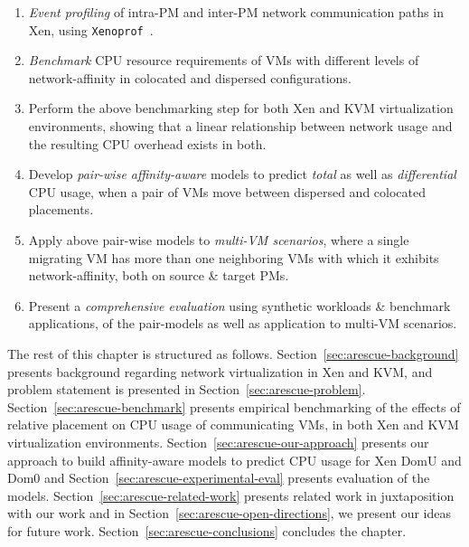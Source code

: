 \begin{enumerate}	
\item \emph{Event profiling} of intra-PM and inter-PM network
	communication paths in Xen, using \texttt{Xenoprof}~\cite{xenoprof}.
\item \emph{Benchmark} CPU resource requirements
of VMs with different levels of network-affinity
in colocated and dispersed configurations.
\item Perform the above benchmarking step for both Xen and KVM virtualization environments,
	showing that a linear relationship between network usage and the resulting CPU overhead
	exists in both.
\item Develop \emph{pair-wise affinity-aware} models to predict \textit{total}
	as well as \textit{differential} CPU usage, when a pair of VMs move between
	dispersed and colocated placements.
\item Apply above pair-wise models to \emph{multi-VM scenarios}, where
	a single migrating VM has more than one neighboring
	VMs with which it exhibits network-affinity, both on source \& target PMs.
\item Present a \emph{comprehensive evaluation} using synthetic 
	workloads \& benchmark applications,
	of the pair-models as well as application to multi-VM scenarios.
\end{enumerate}

\noindent The rest of this chapter is structured as follows. 
Section~\ref{sec:arescue-background}
presents background regarding network virtualization in Xen and KVM, and
problem statement is presented in Section~\ref{sec:arescue-problem}.
Section~\ref{sec:arescue-benchmark}
presents empirical benchmarking of the effects of relative placement on
CPU usage of communicating VMs, in both Xen and KVM virtualization environments.
Section~\ref{sec:arescue-our-approach} presents our approach to
build affinity-aware models to predict CPU usage for Xen DomU and Dom0
and Section~\ref{sec:arescue-experimental-eval} presents evaluation 
of the models.
Section~\ref{sec:arescue-related-work} presents related work in juxtaposition
with our work and 
in Section~\ref{sec:arescue-open-directions}, we
present our ideas for future work.
Section~\ref{sec:arescue-conclusions} concludes the chapter.

